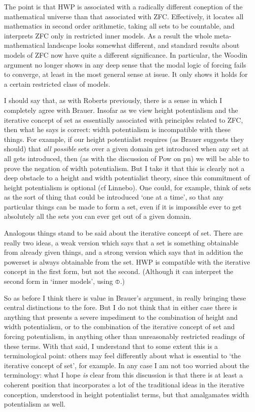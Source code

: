 \documentclass{article}
\begin{document}
The point is that HWP is associated with a radically different coneption of 
the mathematical universe than that associated with ZFC. 
Effectively, it locates all mathematics in second order arithmetic,
taking all sets to be countable, and 
interprets ZFC only in restricted inner models. As a result the 
whole meta-mathematical landscape looks somewhat different, and standard 
results about models of ZFC now have quite a different significance. 
In particular,
the Woodin argument no longer shows in any deep sense that the modal logic 
of forcing fails to converge, at least in the most general sense at issue.
It only shows it holds for a certain restricted class of models.

I should say that, as with Roberts previously, there is a sense in which 
I completely agree with Brauer. Insofar as we view height potentialism 
and the iterative concept of set as essentially associated with principles related 
to ZFC, then what he says is correct: width potentialism is incompatible with these things.
For example, if our height potentialist requires (as Brauer suggests they should)
that \emph{all possible} sets over a given domain get introduced when any set 
at all gets introduced, then (as with the discussion of Pow on pn) we will 
be able to prove the negation of width potentialism. But I take it that this 
is clearly not a deep obstacle to a height and width potentialist theory, 
since this commitment of height potentialism is optional (cf Linnebo).
One could, for example, think of sets as the sort of thing that could be introduced 
`one at a time', so that 
any particular things can be  made to form a set, even if it is impossible ever 
to get absolutely all the sets you can ever get out of a given domain. 

Analogous things stand to be said about the iterative concept of set. There 
are really two ideas, a weak version which says that a set is something obtainable 
from already given things, and  a strong version which says that in addition 
the powerset is always obtainable from the set. HWP is compatible with the iterative concept 
in the first form, but not the second. (Although it can interpret the 
second form in `inner models', using $\circledbar$.)

So as before I think there is value in Brauer's argument, in really bringing these 
central distinctions to the fore. But I do not think that in either case there 
is anything that presents a severe impediment to the combination of height and width 
potentialism, or to the combination of the iterative concept of set and forcing potentialism,
in anything other than unreasonably restricted readings of these terms. With that said,
I understand that to some extent this is a terminological point: others may 
feel differently about what is essential to `the iterative concept of set', for example.
In any case I am not too worried about the terminology: what I hope \emph{is} clear 
from this discussion is that there is 
at least a coherent 
position that incorporates a lot of the traditional ideas in the 
iterative conception, understood in height potentialist terms, but that amalgamates 
width potentialism as well. 
\end{document}
